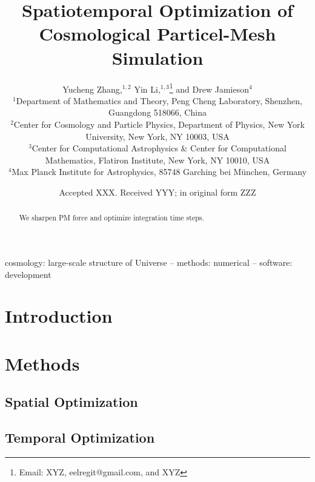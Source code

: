 \documentclass[usenatbib]{mnras}
\title[Spatiotemporally Optimized Simulation]
{Spatiotemporal Optimization of Cosmological Particel-Mesh Simulation}
\author[Zhang, Li, Jamieson, et al.]{
%
Yucheng Zhang,$^{1, 2}$
%
Yin Li,$^{1, 3}$\thanks{Email: XYZ, eelregit@gmail.com, and XYZ}
%
and Drew Jamieson$^{4}$
%
\\$^1$Department of Mathematics and Theory, Peng Cheng Laboratory,
Shenzhen, Guangdong 518066, China
%
\\$^2$Center for Cosmology and Particle Physics, Department of Physics,
New York University, New York, NY 10003, USA
%
\\$^3$Center for Computational Astrophysics \& Center for Computational
Mathematics, Flatiron Institute, New York, NY 10010, USA
%
\\$^4$Max Planck Institute for Astrophysics, 85748 Garching bei
M\"unchen, Germany
}
\date{Accepted XXX. Received YYY; in original form ZZZ}
\begin{document}
\label{firstpage}
\pagerange{\pageref{firstpage}--\pageref{lastpage}}
\maketitle



\begin{abstract}
We sharpen PM force and optimize integration time steps.
\end{abstract}

\begin{keywords}
cosmology: large-scale structure of Universe
-- methods: numerical
-- software: development
\end{keywords}



\section{Introduction}


\section{Methods}


\subsection{Spatial Optimization}


\subsection{Temporal Optimization}
\end{document}
